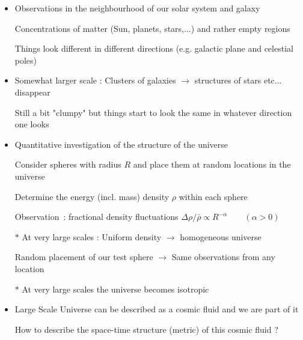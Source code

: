 \onecolumn
\begin{itemize}
\item Observations in the neighbourhood of our solar system and galaxy
\item[] Concentrations of matter (Sun, planets, stars,...) and  rather empty regions
\item[] Things look different in different directions (e.g. galactic plane and celestial poles)
\item Somewhat larger scale : Clusters of galaxies $\rightarrow$ structures of stars etc... disappear
\item[] Still a bit "clumpy" but things start to look the same in whatever direction one looks
\item Quantitative investigation of the structure of the universe
\item[] Consider spheres with radius $R$ and place them at random locations in the universe
\item[] Determine the energy (incl. mass) density $\rho$ within each sphere
\item[] Observation~: fractional density fluctuations
        $\Delta\rho/\bar{\rho} \propto R^{-\alpha} \qquad (\alpha>0)$
\item[$\ast$] At very large scales : Uniform density $\rightarrow$ {\blue homogeneous} universe
\item[] Random placement of our test sphere $\rightarrow$ Same observations from any location
\item[$\ast$] At very large scales the universe becomes {\blue isotropic}
\item Large Scale Universe can be described as a {\red cosmic fluid} and we are part of it
\item[] {\blue How to describe the space-time structure (metric) of this cosmic fluid ?}
\end{itemize}

